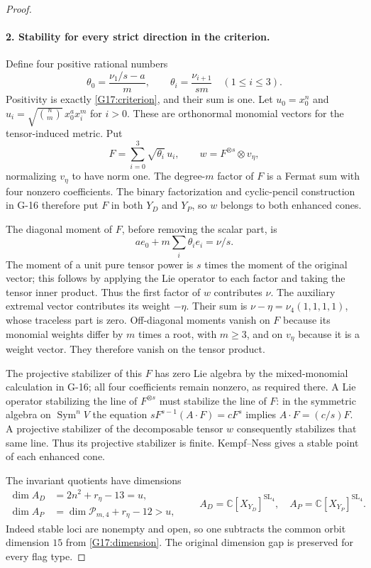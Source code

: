 \documentclass[11pt,a4paper]{article}
\theoremstyle{definition}\newtheorem{definition}{Definition}
\begin{document}
\begin{proof}
\paragraph{2. Stability for every strict direction in the criterion.}
Define four positive rational numbers
\[
 \theta_0=\frac{\nu_1/s-a}{m},\qquad
 \theta_i=\frac{\nu_{i+1}}{sm}\quad(1\leq i\leq3).
\]
Positivity is exactly \eqref{G17:criterion}, and their sum is one.
Let $u_0=x_0^n$ and
$u_i=\sqrt{\binom nm}\,x_0^a x_i^m$ for $i>0$.
These are orthonormal monomial vectors for the tensor-induced metric.
Put
\[
 F=\sum_{i=0}^3\sqrt{\theta_i}\,u_i,
 \qquad w=F^{\otimes s}\otimes v_\eta,
\]
normalizing $v_\eta$ to have norm one. The degree-$m$ factor of $F$
is a Fermat sum with four nonzero coefficients. The binary factorization
and cyclic-pencil construction in G-16 therefore put $F$ in both
$Y_D$ and $Y_P$, so $w$ belongs to both enhanced cones.

The diagonal moment of $F$, before removing the scalar part, is
\[
 a e_0+m\sum_i\theta_i e_i=\nu/s.
\]
The moment of a unit pure tensor power is $s$ times the moment of
the original vector; this follows by applying the Lie operator to
each factor and taking the tensor inner product. Thus the first
factor of $w$ contributes $\nu$. The auxiliary extremal vector
contributes its weight $-\eta$. Their sum is
$\nu-\eta=\nu_4(1,1,1,1)$, whose traceless part is zero.
Off-diagonal moments vanish on $F$ because its monomial weights
differ by $m$ times a root, with $m\geq3$, and on $v_\eta$ because
it is a weight vector. They therefore vanish on the tensor product.

The projective stabilizer of this $F$ has zero Lie algebra by the
mixed-monomial calculation in G-16; all four coefficients remain
nonzero, as required there. A Lie operator stabilizing the line of
$F^{\otimes s}$ must stabilize the line of $F$: in the symmetric
algebra on $\operatorname{Sym}^n V$ the equation
$sF^{s-1}(A\cdot F)=cF^s$ implies $A\cdot F=(c/s)F$.
A projective stabilizer of the decomposable tensor $w$ consequently
stabilizes that same line. Thus its projective stabilizer is finite.
Kempf--Ness gives a stable point of each enhanced cone.

The invariant quotients have dimensions
\begin{equation}\label{G17:quotdims}
 \begin{split}
 \dim A_D&=2n^2+r_\eta-13=u,\\
 \dim A_P&=\dim\mathcal P_{m,4}+r_\eta-12>u,
 \end{split}
 \qquad A_D=\mathbb C[X_{Y_D}]^{\mathrm{SL}_4},\quad
 A_P=\mathbb C[X_{Y_P}]^{\mathrm{SL}_4}.
\end{equation}
Indeed stable loci are nonempty and open, so one subtracts the
common orbit dimension $15$ from \eqref{G17:dimension}.
The original dimension gap is preserved for every flag type.


\end{proof}
\end{document}
